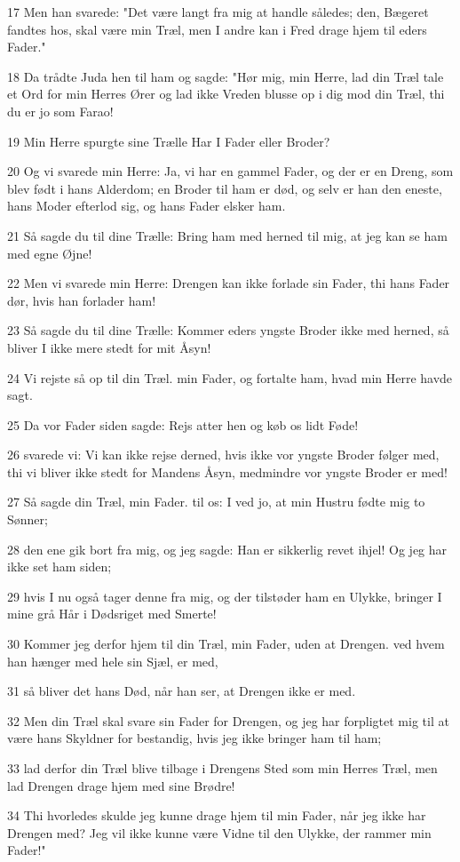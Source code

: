 \par 17 Men han svarede: "Det være langt fra mig at handle således; den, Bægeret fandtes hos, skal være min Træl, men I andre kan i Fred drage hjem til eders Fader."
\par 18 Da trådte Juda hen til ham og sagde: "Hør mig, min Herre, lad din Træl tale et Ord for min Herres Ører og lad ikke Vreden blusse op i dig mod din Træl, thi du er jo som Farao!
\par 19 Min Herre spurgte sine Trælle Har I Fader eller Broder?
\par 20 Og vi svarede min Herre: Ja, vi har en gammel Fader, og der er en Dreng, som blev født i hans Alderdom; en Broder til ham er død, og selv er han den eneste, hans Moder efterlod sig, og hans Fader elsker ham.
\par 21 Så sagde du til dine Trælle: Bring ham med herned til mig, at jeg kan se ham med egne Øjne!
\par 22 Men vi svarede min Herre: Drengen kan ikke forlade sin Fader, thi hans Fader dør, hvis han forlader ham!
\par 23 Så sagde du til dine Trælle: Kommer eders yngste Broder ikke med herned, så bliver I ikke mere stedt for mit Åsyn!
\par 24 Vi rejste så op til din Træl. min Fader, og fortalte ham, hvad min Herre havde sagt.
\par 25 Da vor Fader siden sagde: Rejs atter hen og køb os lidt Føde!
\par 26 svarede vi: Vi kan ikke rejse derned, hvis ikke vor yngste Broder følger med, thi vi bliver ikke stedt for Mandens Åsyn, medmindre vor yngste Broder er med!
\par 27 Så sagde din Træl, min Fader. til os: I ved jo, at min Hustru fødte mig to Sønner;
\par 28 den ene gik bort fra mig, og jeg sagde: Han er sikkerlig revet ihjel! Og jeg har ikke set ham siden;
\par 29 hvis I nu også tager denne fra mig, og der tilstøder ham en Ulykke, bringer I mine grå Hår i Dødsriget med Smerte!
\par 30 Kommer jeg derfor hjem til din Træl, min Fader, uden at Drengen. ved hvem han hænger med hele sin Sjæl, er med,
\par 31 så bliver det hans Død, når han ser, at Drengen ikke er med.
\par 32 Men din Træl skal svare sin Fader for Drengen, og jeg har forpligtet mig til at være hans Skyldner for bestandig, hvis jeg ikke bringer ham til ham;
\par 33 lad derfor din Træl blive tilbage i Drengens Sted som min Herres Træl, men lad Drengen drage hjem med sine Brødre!
\par 34 Thi hvorledes skulde jeg kunne drage hjem til min Fader, når jeg ikke har Drengen med? Jeg vil ikke kunne være Vidne til den Ulykke, der rammer min Fader!"

